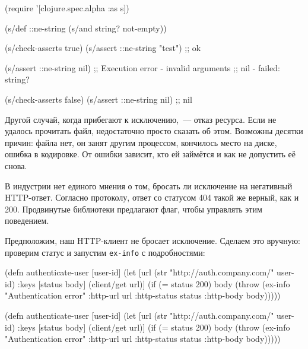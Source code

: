 \else

\begin{english}
  \begin{clojure}
(require '[clojure.spec.alpha :as s])

(s/def ::ne-string (s/and string? not-empty))

(s/check-asserts true)
(s/assert ::ne-string "test") ;; ok

(s/assert ::ne-string nil)
;; Execution error - invalid arguments
;; nil - failed: string?

(s/check-asserts false)
(s/assert ::ne-string nil) ;; nil
  \end{clojure}
\end{english}

\fi

Другой случай, когда прибегают к исключению,~--- отказ ресурса. Если не удалось
прочитать файл, недостаточно просто сказать об этом. Возможны десятки причин:
файла нет, он занят другим процессом, кончилось место на диске, ошибка в
кодировке. От ошибки зависит, кто ей займётся и как не допустить её
снова.


В индустрии нет единого мнения о том, бросать ли исключение на негативный
HTTP-ответ. Согласно протоколу, ответ со статусом 404 такой же верный, как и
200. Продвинутые библиотеки предлагают флаг, чтобы управлять этим поведением.

Предположим, наш HTTP-клиент не бросает исключение. Сделаем это вручную:
проверим статус и запустим \verb|ex-info| с подробностями:


\ifnarrow

\begin{english}
  \begin{clojure}
(defn authenticate-user [user-id]
  (let [url (str
              "http://auth.company.com/"
              user-id)
        {:keys [status body]}
        (client/get url)]
    (if (= status 200)
      body
      (throw (ex-info
               "Authentication error"
               {:http-url url
                :http-status status
                :http-body body})))))
  \end{clojure}
\end{english}

\else

\begin{english}
  \begin{clojure}
(defn authenticate-user [user-id]
  (let [url (str "http://auth.company.com/" user-id)
        {:keys [status body]} (client/get url)]
    (if (= status 200)
      body
      (throw (ex-info "Authentication error"
                      {:http-url url
                       :http-status status
                       :http-body body})))))
  \end{clojure}
\end{english}


